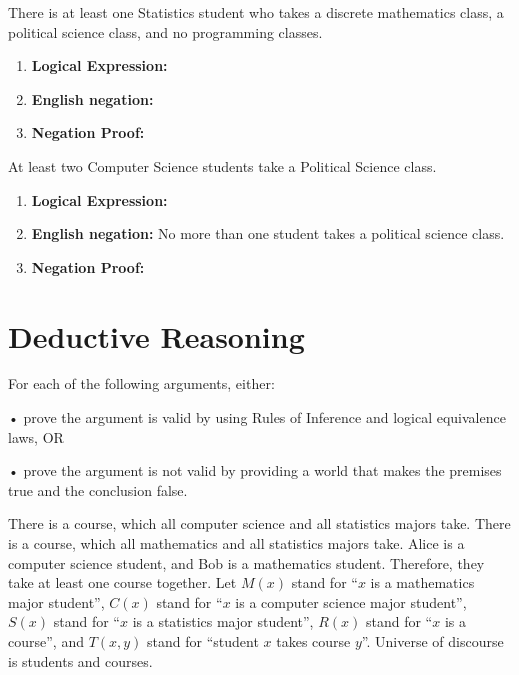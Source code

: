 \documentclass[]{article}
\begin{document}
\begin{question}{2.4}
There is at least one Statistics student who takes a discrete mathematics class, a political science class, and no
programming classes.
\end{question}
\begin{enumerate}[label=(\alph*)]
    \item \textbf{Logical Expression:} 
    \item \textbf{English negation:} 
    \item \textbf{Negation Proof:}
\end{enumerate}

\begin{question}{2.5}
At least two Computer Science students take a Political Science class.
\end{question}
\begin{enumerate}[label=(\alph*)]
    \item \textbf{Logical Expression:}
    \item \textbf{English negation:} No more than one student takes a political science class.
    \item \textbf{Negation Proof:}
\end{enumerate}

\section{Deductive Reasoning}
For each of the following arguments, either:

• prove the argument is valid by using Rules of Inference and logical equivalence laws, OR

• prove the argument is not valid by providing a world that makes the premises true and the conclusion false.


\begin{question}{3.1}
    There is a course, which all computer science and all statistics majors take. There is a course, which all
    mathematics and all statistics majors take. Alice is a computer science student, and Bob is a mathematics
    student. Therefore, they take at least one course together.
    \medbreak
Let $M(x)$ stand for “$x$ is a mathematics major student”, $C(x)$ stand for “$x$ is a computer science major student”,
$S(x)$ stand for “$x$ is a statistics major student”, $R(x)$ stand for “$x$ is a course”, and $T(x, y)$ stand for “student
$x$ takes course $y$”. Universe of discourse is students and courses.
\end{question}
\end{document}
